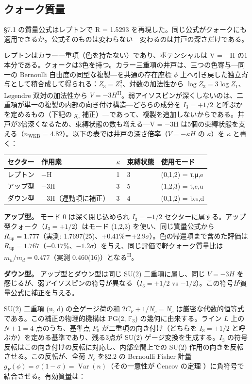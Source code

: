 \documentclass[fontsize=11pt,paper=a4,lualatex]{jlreq}
\newcommand{\PII}{\textsuperscript{\textup{II}}}
\begin{document}
\subsection{クォーク質量}\label{ux30afux30a9ux30fcux30afux8ceaux91cf}

§7.1 の質量公式はレプトンで R = 1.5293
を再現した。同じ公式がクォークにも適用できるか。公式そのものは変わらない---変わるのは井戸の深さだけである。

レプトンはカラー一重項（色を持たない）であり、ポテンシャルは V = −H
の1本分である。クォークは3色を持つ。カラー三重項の井戸は、三つの色寄与---同一の Bernoulli 自由度の同型な複製---を共通の存在座標 $\phi$ 上へ引き戻した独立寄与として積合成して得られる：$Z_3 = Z_1^3$、対数の加法性から $\log Z_3 = 3\log Z_1$、Legendre 双対の加法性から $V = -3H$\PII{}。弱アイソスピンが深くしないのは、二重項が単一の複製の内部の向き付け構造---どちらの成分を $I_3 = +1/2$ と呼ぶかを定めるもの（下記の $g_c$ 補正）---であって、複製を追加しないからである。井戸が3倍深くなるため、束縛状態の数も増える---V = −3H
は5個の束縛状態を支える（$n_{\mathrm{WKB}}$ = 4.82）。以下の表では井戸の深さ倍率（$V = -\kappa H$ の $\kappa$）を $\kappa$ と書く：

\begin{longtable}[]{@{}lllll@{}}
\toprule\noalign{}
セクター & 作用素 & $\kappa$ & 束縛状態 & 使用モード \\
\midrule\noalign{}
\endhead
\bottomrule\noalign{}
\endlastfoot
レプトン & −H & 1 & 3 & (0,1,2) = τ,μ,e \\
アップ型 & −3H & 3 & 5 & (1,2,3) = t,c,u \\
ダウン型 & −3H（運動項に補正） & 3 & 4 & (0,1,2) = b,s,d \\
\end{longtable}

\noindent\textbf{アップ型。} モード 0 は深く閉じ込められ $I_3 = -1/2$ セクターに属する。アップ型クォーク（$I_3 = +1/2$）はモード (1,2,3) を使い、同じ質量公式から $R_\mathrm{up} = 1.777$（実測: 1.7697(25)、$+0.41\%$＝$+2.9\sigma$）。色の帰還項まで含めた評価は $R_\mathrm{up} = 1.767$（$-0.17\%$、$-1.2\sigma$）を与え、同じ評価で軽クォーク質量比は $m_u/m_d = 0.477$（実測 0.460(16)）となる\PII{}。

\noindent\textbf{ダウン型。} アップ型とダウン型は同じ SU(2) 二重項に属し、同じ $V = -3H$ を感じるが、弱アイソスピンの符号が異なる（$I_3 = +1/2$ vs $-1/2$）。この符号が質量公式に補正を与える。

SU(2) 二重項 (u, d) の全ゲージ荷の和 $2C_F + 1/N_c = N_c$ は厳密な代数的恒等式である。この補正の物理的機構は PG(2, $\mathbb{F}_3$) の幾何に由来する。ライン $L$ 上の $N+1 = 4$ 点のうち、基準点 $P_0$ が二重項の向き付け（どちらを $I_3 = +1/2$ と呼ぶか）を定める基準であり、残る3点が SU(2) ゲージ変換を生成する。$I_3$ の符号反転はこの向き付けの反転に対応し、内部空間上での SU(2) 作用の向きを反転させる。この反転が、全荷 $N_c$ を§2.2 の Bernoulli Fisher 計量 $g_F(\phi) = \sigma(1{-}\sigma) = \operatorname{Var}(n)$（その一意性が \v{C}encov の定理 \cite{cencov}）に負符号で結合させる。有効質量は：
\end{document}
